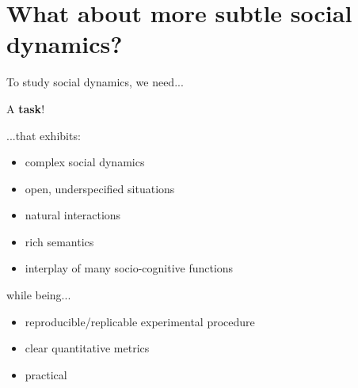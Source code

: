 \documentclass[compress]{beamer}
\begin{document}


\section[PInSoRo]{What about more subtle social dynamics?}

\begin{frame}{To study social dynamics, we need...}

    \pause

    \begin{center}
        A {\bf task}!
    \end{center}
    
    \pause
    ...that exhibits:

    \begin{itemize}
        \item complex social dynamics
        \item open, underspecified situations
        \item natural interactions
        \item rich semantics
        \item interplay of many socio-cognitive functions
    \end{itemize}

    \pause

    while being...
    \begin{itemize}
        \item reproducible/replicable experimental procedure
        \item clear quantitative metrics
        \item practical
    \end{itemize}
\end{frame}
\end{document}
